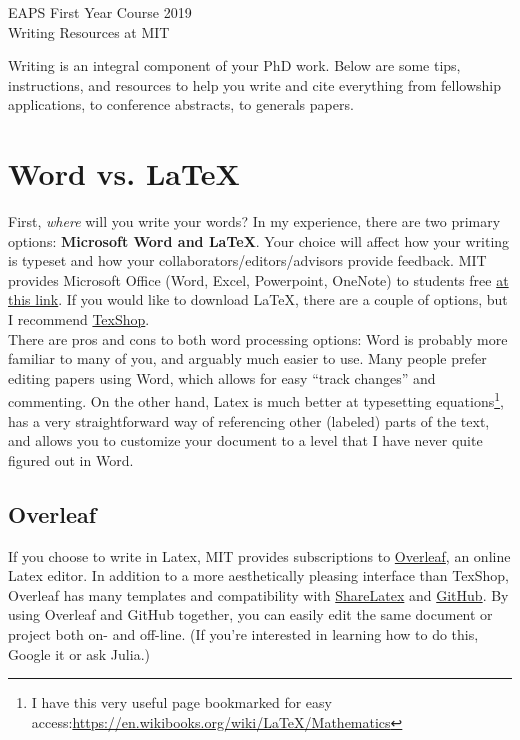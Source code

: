 \documentclass{article}
\begin{document}
\begin{center}
{\LARGE EAPS First Year Course 2019}\\
\vspace{10pt}
{\Large Writing Resources at MIT}\\
\vspace{6pt}
\end{center}
Writing is an integral component of your PhD work. Below are some tips, instructions, and resources to help you write and cite everything from fellowship applications, to conference abstracts, to generals papers.

\section*{Word vs. \LaTeX}
First, \emph{where} will you write your words? In my experience, there are two primary options:
\textbf{Microsoft Word and \LaTeX}.
Your choice will affect how your writing is typeset and how your collaborators/editors/advisors provide feedback. MIT provides Microsoft Office (Word, Excel, Powerpoint, OneNote) to students free \href{https://ist.mit.edu/office/license}{at this link}. If you would like to download \LaTeX, there are a couple of options, but I recommend \href{https://pages.uoregon.edu/koch/texshop/}{TexShop}.\\

There are pros and cons to both word processing options: Word is probably more familiar to many of you, and arguably much easier to use. Many people prefer editing papers using Word, which allows for easy ``track changes'' and commenting. On the other hand, Latex is much better at typesetting equations\footnote{I have this very useful page bookmarked for easy access:\href{ https://en.wikibooks.org/wiki/LaTeX/Mathematics}{https://en.wikibooks.org/wiki/LaTeX/Mathematics}}, has a very straightforward way of referencing other (labeled) parts of the text, and allows you to customize your document to a level that I have never quite figured out in Word. 

\subsection*{Overleaf}
If you choose to write in Latex, MIT provides subscriptions to \href{https://www.overleaf.com}{Overleaf}, an online Latex editor. In addition to a more aesthetically pleasing interface than TexShop, Overleaf has many templates and compatibility with \href{https://www.sharelatex.com}{ShareLatex} and
\href{https://github.com}{GitHub}. By using Overleaf and GitHub together, you can easily edit the same document or project both on- and off-line. (If you're interested in learning how to do this, Google it or ask Julia.)
\end{document}
